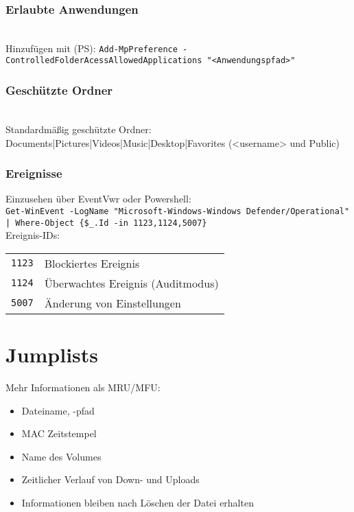 \begin{multicols}{3}
\subsubsection{Erlaubte Anwendungen}
\\
Hinzufügen mit (PS): \texttt{Add-MpPreference -ControlledFolderAcessAllowedApplications "<Anwendungspfad>"}

\subsubsection{Geschützte Ordner}
\\
Standardmäßig geschützte Ordner: Documents|Pictures|Videos|Music|Desktop|Favorites (<username> und Public)\\


\subsubsection{Ereignisse}
Einzusehen über EventVwr
oder Powershell:\\
\texttt{Get-WinEvent -LogName "Microsoft-Windows-Windows Defender/Operational" | Where-Object \{\$\_.Id -in 1123,1124,5007\}}\\
Ereignis-IDs:
\begin{tabular}{@{}p{\the\MyLen}%
		@{}p{\linewidth-\the\MyLen}@{}}
	\texttt{1123} & Blockiertes Ereignis\\
	\texttt{1124} & Überwachtes Ereignis (Auditmodus)\\
	\texttt{5007} & Änderung von Einstellungen\\
\end{tabular}


\section{Jumplists}
Mehr Informationen als MRU/MFU:
\begin{itemize}[leftmargin=*]
	\item Dateiname, -pfad
	\item MAC Zeitstempel
	\item Name des Volumes
	\item Zeitlicher Verlauf von Down- und Uploads
	\item Informationen bleiben nach Löschen der Datei erhalten
\end{itemize}


\end{multicols}
